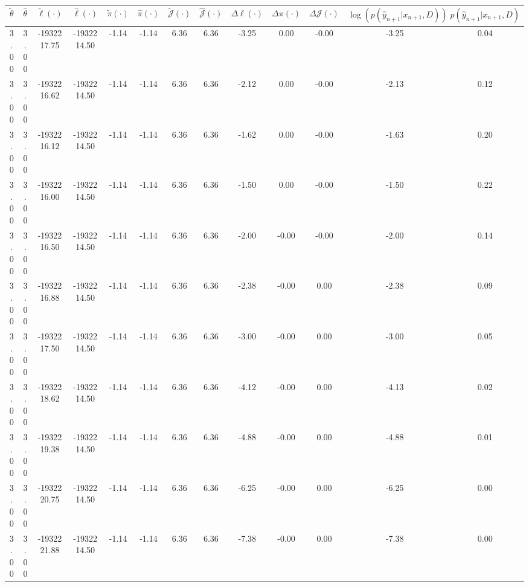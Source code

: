 \begin{table}[htbp]
        \centering
        \tiny
        \begin{adjustbox}{angle=90}
            \begin{tabular}{|c|c|c|c|c|c|c|c|c|c|c|c|c|}
                \hline
                 $\tilde{\theta}$ & $\hat{\theta}$ & $\tilde{\ell}(\cdot)$ & $\hat{\ell}(\cdot)$ & $\tilde{\pi}(\cdot)$ & $\hat{\pi}(\cdot)$ & $\tilde{\mathcal{J}}(\cdot)$ & $\hat{\mathcal{J}}(\cdot)$ & $\Delta \ell(\cdot)$ & $\Delta \pi(\cdot)$ & $\Delta \mathcal{J}(\cdot)$ & $\log(p(\hat{y}_{n+1}|x_{n+1}, D))$ & $p(\hat{y}_{n+1}|x_{n+1}, D)$ \\
                \hline
                 3.00 & 3.00 & -1932217.75 & -1932214.50 & -1.14 & -1.14 & 6.36 & 6.36 & -3.25 & 0.00 & -0.00 & -3.25 & 0.04\\ \hline
 3.00 & 3.00 & -1932216.62 & -1932214.50 & -1.14 & -1.14 & 6.36 & 6.36 & -2.12 & 0.00 & -0.00 & -2.13 & 0.12\\ \hline
 3.00 & 3.00 & -1932216.12 & -1932214.50 & -1.14 & -1.14 & 6.36 & 6.36 & -1.62 & 0.00 & -0.00 & -1.63 & 0.20\\ \hline
 3.00 & 3.00 & -1932216.00 & -1932214.50 & -1.14 & -1.14 & 6.36 & 6.36 & -1.50 & 0.00 & -0.00 & -1.50 & 0.22\\ \hline
 3.00 & 3.00 & -1932216.50 & -1932214.50 & -1.14 & -1.14 & 6.36 & 6.36 & -2.00 & -0.00 & -0.00 & -2.00 & 0.14\\ \hline
 3.00 & 3.00 & -1932216.88 & -1932214.50 & -1.14 & -1.14 & 6.36 & 6.36 & -2.38 & -0.00 & 0.00 & -2.38 & 0.09\\ \hline
 3.00 & 3.00 & -1932217.50 & -1932214.50 & -1.14 & -1.14 & 6.36 & 6.36 & -3.00 & -0.00 & 0.00 & -3.00 & 0.05\\ \hline
 3.00 & 3.00 & -1932218.62 & -1932214.50 & -1.14 & -1.14 & 6.36 & 6.36 & -4.12 & -0.00 & 0.00 & -4.13 & 0.02\\ \hline
 3.00 & 3.00 & -1932219.38 & -1932214.50 & -1.14 & -1.14 & 6.36 & 6.36 & -4.88 & -0.00 & 0.00 & -4.88 & 0.01\\ \hline
 3.00 & 3.00 & -1932220.75 & -1932214.50 & -1.14 & -1.14 & 6.36 & 6.36 & -6.25 & -0.00 & 0.00 & -6.25 & 0.00\\ \hline
 3.00 & 3.00 & -1932221.88 & -1932214.50 & -1.14 & -1.14 & 6.36 & 6.36 & -7.38 & -0.00 & 0.00 & -7.38 & 0.00\\ \hline
            \end{tabular}
        \end{adjustbox}
        \caption{}
        \label{}
    \end{table}
    